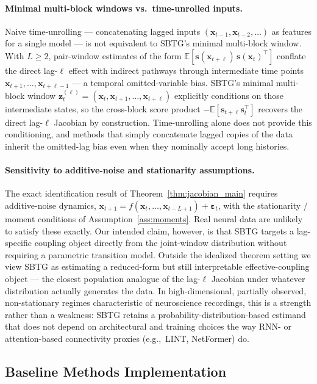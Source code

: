 \documentclass{article}
\theoremstyle{plain}
\theoremstyle{definition}
\theoremstyle{remark}
\newcommand{\E}{\mathbb{E}}
\newcommand{\1}{\mathbf{1}}
\newcommand{\x}{\bm{x}}
\newcommand{\z}{\bm{z}}
\newcommand{\s}{\bm{s}}
\begin{document}
\paragraph{Minimal multi-block windows vs.\ time-unrolled inputs.}
\label{app:multiblock_vs_unroll}
Naive time-unrolling --- concatenating lagged inputs $(\x_{t-1}, \x_{t-2}, \ldots)$ as features for a single model --- is not equivalent to SBTG's minimal multi-block window. With $L \ge 2$, pair-window estimates of the form $\E[\s(\x_{t+\ell})\,\s(\x_t)^\top]$ conflate the direct lag-$\ell$ effect with indirect pathways through intermediate time points $\x_{t+1},\dots,\x_{t+\ell-1}$ --- a temporal omitted-variable bias. SBTG's minimal multi-block window $\z^{(\ell)}_t = (\x_t, \x_{t+1}, \ldots, \x_{t+\ell})$ explicitly conditions on those intermediate states, so the cross-block score product $-\E[\s_{t+\ell}\s_t^\top]$ recovers the direct lag-$\ell$ Jacobian by construction. Time-unrolling alone does not provide this conditioning, and methods that simply concatenate lagged copies of the data inherit the omitted-lag bias even when they nominally accept long histories.

\paragraph{Sensitivity to additive-noise and stationarity assumptions.}
\label{app:noise_assumptions}
The exact identification result of Theorem~\ref{thm:jacobian_main} requires additive-noise dynamics, $\bm{x}_{t+1} = f(\bm{x}_t, \ldots, \bm{x}_{t-L+1}) + \bm{\varepsilon}_t$, with the stationarity / moment conditions of Assumption~\ref{ass:moments}. Real neural data are unlikely to satisfy these exactly. Our intended claim, however, is that SBTG targets a lag-specific coupling object directly from the joint-window distribution without requiring a parametric transition model. Outside the idealized theorem setting we view SBTG as estimating a reduced-form but still interpretable effective-coupling object --- the closest population analogue of the lag-$\ell$ Jacobian under whatever distribution actually generates the data. In high-dimensional, partially observed, non-stationary regimes characteristic of neuroscience recordings, this is a strength rather than a weakness: SBTG retains a probability-distribution-based estimand that does not depend on architectural and training choices the way RNN- or attention-based connectivity proxies (e.g.,~LINT, NetFormer) do.


\subsection{Baseline Methods Implementation}
\label{app:baselines}
\end{document}
